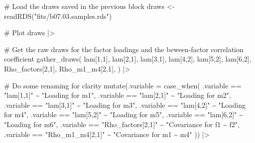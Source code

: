\documentclass[
  letterpaper,
  DIV=11,
  numbers=noendperiod]{scrreprt}
\newenvironment{Shaded}{\begin{snugshade}}{\end{snugshade}}
\newcommand{\AttributeTok}[1]{\textcolor[rgb]{0.40,0.45,0.13}{#1}}
\newcommand{\CommentTok}[1]{\textcolor[rgb]{0.37,0.37,0.37}{#1}}
\newcommand{\FunctionTok}[1]{\textcolor[rgb]{0.28,0.35,0.67}{#1}}
\newcommand{\NormalTok}[1]{\textcolor[rgb]{0.00,0.23,0.31}{#1}}
\newcommand{\OtherTok}[1]{\textcolor[rgb]{0.00,0.23,0.31}{#1}}
\newcommand{\SpecialCharTok}[1]{\textcolor[rgb]{0.37,0.37,0.37}{#1}}
\newcommand{\StringTok}[1]{\textcolor[rgb]{0.13,0.47,0.30}{#1}}
\begin{document}
\begin{Shaded}
\begin{Highlighting}[]
\CommentTok{\# Load the draws saved in the previous block}
\NormalTok{draws }\OtherTok{\textless{}{-}} \FunctionTok{readRDS}\NormalTok{(}\StringTok{"fits/b07.03.samples.rds"}\NormalTok{)}

\CommentTok{\# Plot}
\NormalTok{draws }\SpecialCharTok{|\textgreater{}}

  \CommentTok{\# Get the raw draws for the factor loadings and the beween{-}factor correlation coefficient}
  \FunctionTok{gather\_draws}\NormalTok{(}
   \StringTok{\textasciigrave{}}\AttributeTok{lam[1,1]}\StringTok{\textasciigrave{}}\NormalTok{,}
   \StringTok{\textasciigrave{}}\AttributeTok{lam[2,1]}\StringTok{\textasciigrave{}}\NormalTok{,}
   \StringTok{\textasciigrave{}}\AttributeTok{lam[3,1]}\StringTok{\textasciigrave{}}\NormalTok{,}
   \StringTok{\textasciigrave{}}\AttributeTok{lam[4,2]}\StringTok{\textasciigrave{}}\NormalTok{,}
   \StringTok{\textasciigrave{}}\AttributeTok{lam[5,2]}\StringTok{\textasciigrave{}}\NormalTok{,}
   \StringTok{\textasciigrave{}}\AttributeTok{lam[6,2]}\StringTok{\textasciigrave{}}\NormalTok{,}
   \StringTok{\textasciigrave{}}\AttributeTok{Rho\_factors[2,1]}\StringTok{\textasciigrave{}}\NormalTok{,}
   \StringTok{\textasciigrave{}}\AttributeTok{Rho\_m1\_m4[2,1]}\StringTok{\textasciigrave{}}\NormalTok{,}
\NormalTok{  ) }\SpecialCharTok{|\textgreater{}}

  \CommentTok{\# Do some renaming for clarity}
  \FunctionTok{mutate}\NormalTok{(}\AttributeTok{.variable =} \FunctionTok{case\_when}\NormalTok{(}
\NormalTok{    .variable }\SpecialCharTok{==} \StringTok{"lam[1,1]"} \SpecialCharTok{\textasciitilde{}} \StringTok{"Loading for m1"}\NormalTok{,}
\NormalTok{    .variable }\SpecialCharTok{==} \StringTok{"lam[2,1]"} \SpecialCharTok{\textasciitilde{}} \StringTok{"Loading for m2"}\NormalTok{,}
\NormalTok{    .variable }\SpecialCharTok{==} \StringTok{"lam[3,1]"} \SpecialCharTok{\textasciitilde{}} \StringTok{"Loading for m3"}\NormalTok{,}
\NormalTok{    .variable }\SpecialCharTok{==} \StringTok{"lam[4,2]"} \SpecialCharTok{\textasciitilde{}} \StringTok{"Loading for m4"}\NormalTok{,}
\NormalTok{    .variable }\SpecialCharTok{==} \StringTok{"lam[5,2]"} \SpecialCharTok{\textasciitilde{}} \StringTok{"Loading for m5"}\NormalTok{,}
\NormalTok{    .variable }\SpecialCharTok{==} \StringTok{"lam[6,2]"} \SpecialCharTok{\textasciitilde{}} \StringTok{"Loading for m6"}\NormalTok{,}
\NormalTok{    .variable }\SpecialCharTok{==} \StringTok{"Rho\_factors[2,1]"} \SpecialCharTok{\textasciitilde{}} \StringTok{"Covariance for f1 \textasciitilde{} f2"}\NormalTok{,}
\NormalTok{    .variable }\SpecialCharTok{==} \StringTok{"Rho\_m1\_m4[2,1]"} \SpecialCharTok{\textasciitilde{}} \StringTok{"Covariance for m1 \textasciitilde{} m4"}
\NormalTok{  )) }\SpecialCharTok{|\textgreater{}}


\end{Highlighting}
\end{Shaded}
\end{document}
